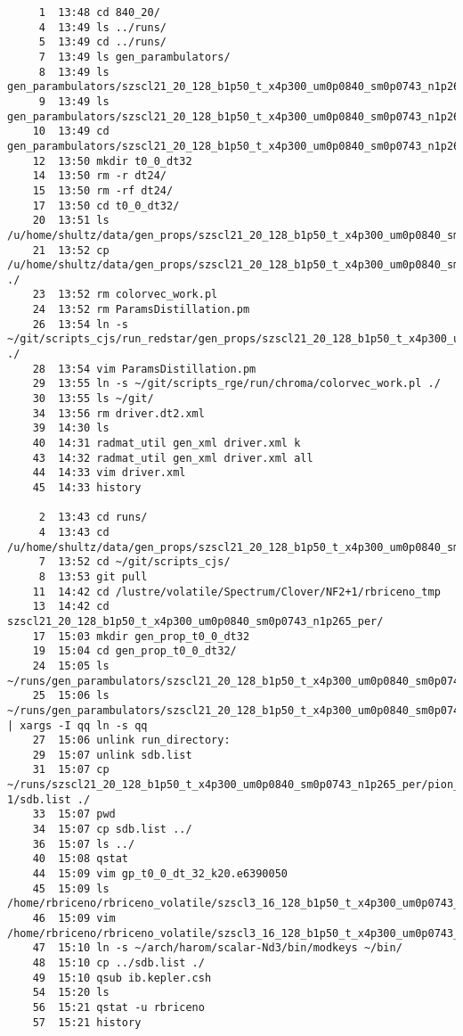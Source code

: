 \documentclass[prd,showpacs,showkeys,preprintnumbers,floatfix,
nofootinbib,superscriptaddress]{revtex4}
\begin{document}
\footnotesize
\begin{verbatim}
     1  13:48 cd 840_20/
     4  13:49 ls ../runs/
     5  13:49 cd ../runs/
     7  13:49 ls gen_parambulators/     
     8  13:49 ls gen_parambulators/szscl21_20_128_b1p50_t_x4p300_um0p0840_sm0p0743_n1p265/
     9  13:49 ls gen_parambulators/szscl21_20_128_b1p50_t_x4p300_um0p0840_sm0p0743_n1p265/dt24/isospin0_annih/
    10  13:49 cd gen_parambulators/szscl21_20_128_b1p50_t_x4p300_um0p0840_sm0p0743_n1p265/
    12  13:50 mkdir t0_0_dt32
    14  13:50 rm -r dt24/
    15  13:50 rm -rf dt24/
    17  13:50 cd t0_0_dt32/
    20  13:51 ls /u/home/shultz/data/gen_props/szscl21_20_128_b1p50_t_x4p300_um0p0840_sm0p0743_n1p265/combined_run/t0_0_dt32
    21  13:52 cp /u/home/shultz/data/gen_props/szscl21_20_128_b1p50_t_x4p300_um0p0840_sm0p0743_n1p265/combined_run/t0_0_dt32/* ./
    23  13:52 rm colorvec_work.pl
    24  13:52 rm ParamsDistillation.pm
    26  13:54 ln -s ~/git/scripts_cjs/run_redstar/gen_props/szscl21_20_128_b1p50_t_x4p300_um0p0840_sm0p0743_n1p265_per/ParamsDistillation.pm ./
    28  13:54 vim ParamsDistillation.pm
    29  13:55 ln -s ~/git/scripts_rge/run/chroma/colorvec_work.pl ./
    30  13:55 ls ~/git/
    34  13:56 rm driver.dt2.xml
    39  14:30 ls
    40  14:31 radmat_util gen_xml driver.xml k
    43  14:32 radmat_util gen_xml driver.xml all
    44  14:33 vim driver.xml
    45  14:33 history

     2  13:43 cd runs/
     4  13:43 cd /u/home/shultz/data/gen_props/szscl21_20_128_b1p50_t_x4p300_um0p0840_sm0p0743_n1p265/combined_run/t0_0_dt32
     7  13:52 cd ~/git/scripts_cjs/
     8  13:53 git pull
    11  14:42 cd /lustre/volatile/Spectrum/Clover/NF2+1/rbriceno_tmp
    13  14:42 cd szscl21_20_128_b1p50_t_x4p300_um0p0840_sm0p0743_n1p265_per/
    17  15:03 mkdir gen_prop_t0_0_dt32
    19  15:04 cd gen_prop_t0_0_dt32/
    24  15:05 ls ~/runs/gen_parambulators/szscl21_20_128_b1p50_t_x4p300_um0p0840_sm0p0743_n1p265/t0_0_dt32/*
    25  15:06 ls ~/runs/gen_parambulators/szscl21_20_128_b1p50_t_x4p300_um0p0840_sm0p0743_n1p265/t0_0_dt32/* | xargs -I qq ln -s qq
    27  15:06 unlink run_directory:
    29  15:07 unlink sdb.list
    31  15:07 cp ~/runs/szscl21_20_128_b1p50_t_x4p300_um0p0840_sm0p0743_n1p265_per/pion_proj9__rho_proj0-1/sdb.list ./
    33  15:07 pwd
    34  15:07 cp sdb.list ../
    36  15:07 ls ../
    40  15:08 qstat
    44  15:09 vim gp_t0_0_dt_32_k20.e6390050
    45  15:09 ls /home/rbriceno/rbriceno_volatile/szscl3_16_128_b1p50_t_x4p300_um0p0743_n1p265_per/szscl3_16_128_b1p50_t_x4p300_um0p0743_n1p265_per.out1000
    46  15:09 vim /home/rbriceno/rbriceno_volatile/szscl3_16_128_b1p50_t_x4p300_um0p0743_n1p265_per/szscl3_16_128_b1p50_t_x4p300_um0p0743_n1p265_per.out1000
    47  15:10 ln -s ~/arch/harom/scalar-Nd3/bin/modkeys ~/bin/
    48  15:10 cp ../sdb.list ./
    49  15:10 qsub ib.kepler.csh
    54  15:20 ls
    56  15:21 qstat -u rbriceno
    57  15:21 history


\end{verbatim}
\end{document}
